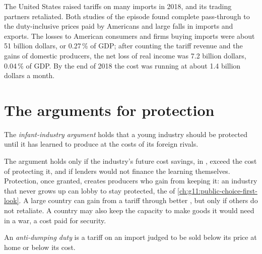 \begin{record}
The United States raised tariffs on many imports in 2018, and its trading partners retaliated. Both studies of the episode found complete pass-through to the
duty-inclusive prices paid by Americans and large falls in imports and exports. The losses to American consumers and firms buying imports were about 51 billion dollars, or
0.27\,\% of GDP; after counting the tariff revenue and the gains of domestic producers, the net loss of real income was 7.2 billion dollars, 0.04\,\% of GDP. By the end of
2018 the cost was running at about 1.4 billion dollars a month.
\end{record}

\section{The arguments for protection}\label{sec:g12:trade-and-trade-policy:arguments}

\begin{definition}\label{def:g12:trade-and-trade-policy:infant-industry}
The \emph{infant-industry argument} holds that a young industry should be protected until it has learned to produce at the costs of its foreign
rivals.
\end{definition}

The argument holds only if the industry's future cost savings, in , exceed the cost of protecting it, and if lenders would not finance the learning
themselves. Protection, once granted, creates producers who gain from keeping it: an industry that never grows up can lobby to stay protected, the  of
\cref{ch:g11:public-choice-first-look}. A large country can gain from a tariff through better , but only if others do not retaliate. A country may also keep
the capacity to make goods it would need in a war, a cost paid for security.

\begin{definition}\label{def:g12:trade-and-trade-policy:anti-dumping}
An \emph{anti-dumping duty} is a tariff on an import judged to be sold below its price at home or below its cost.
\end{definition}

